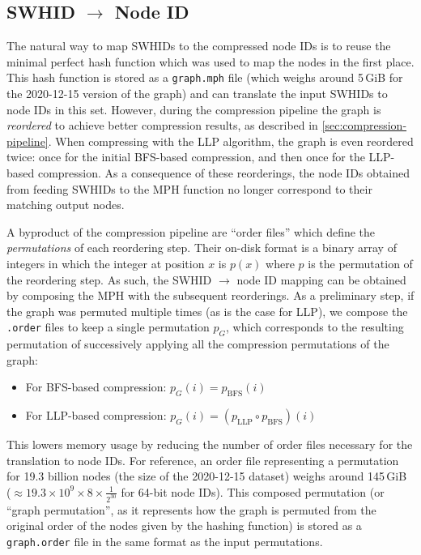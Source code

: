 \subsection{SWHID $\to$ Node ID}%
\label{sec:swhid2node}

The natural way to map \glspl{SWHID} to the compressed node IDs is to reuse the
minimal perfect hash function which was used to map the nodes in the first
place.
This hash function is stored as a \texttt{graph.mph} file (which weighs
around 5\,GiB for the 2020-12-15 version of the graph) and can translate the
input \glspl{SWHID} to node IDs in this set. However, during the compression
pipeline the graph is \emph{reordered} to achieve better compression results,
as described in \cref{sec:compression-pipeline}. When compressing with the
\gls{LLP} algorithm, the graph is even reordered twice: once for the initial
BFS-based compression, and then once for the LLP-based compression. As a
consequence of these reorderings, the node IDs obtained from feeding
\glspl{SWHID} to the \gls{MPH} function no longer correspond to their matching
output nodes.

A byproduct of the compression pipeline are ``order files'' which define
the \emph{permutations} of each reordering step. Their on-disk format is a
binary array of integers in which the integer at position $x$ is $p(x)$ where
$p$ is the permutation of the reordering step. As such, the \gls{SWHID} $\to$
node ID mapping can be obtained by composing the \gls{MPH} with the subsequent
reorderings. As a preliminary step, if the graph was permuted multiple times
(as is the case for \gls{LLP}), we compose the \texttt{.order} files to keep a
single permutation $p_G$, which corresponds to the resulting permutation of
successively applying all the compression permutations of the graph:

\begin{itemize}
    \item For BFS-based compression: $p_G(i) = p_{\mathrm{BFS}}(i)$
    \item For LLP-based compression:
        $p_G(i) = (p_{\mathrm{LLP}} \circ p_{\mathrm{BFS}})(i)$
\end{itemize}

This lowers memory usage by reducing the number of order files necessary for
the translation to node IDs. For reference, an order file representing a
permutation for 19.3 billion nodes (the size of the 2020-12-15 dataset) weighs
around 145\,GiB ($\approx 19.3 \times 10^9 \times 8 \times \frac{1}{2^{30}}$
for 64-bit node IDs).
This composed permutation (or ``graph permutation'', as it represents how the
graph is permuted from the original order of the nodes given by the hashing
function) is stored as a \texttt{graph.order} file in the same format as the
input permutations.


